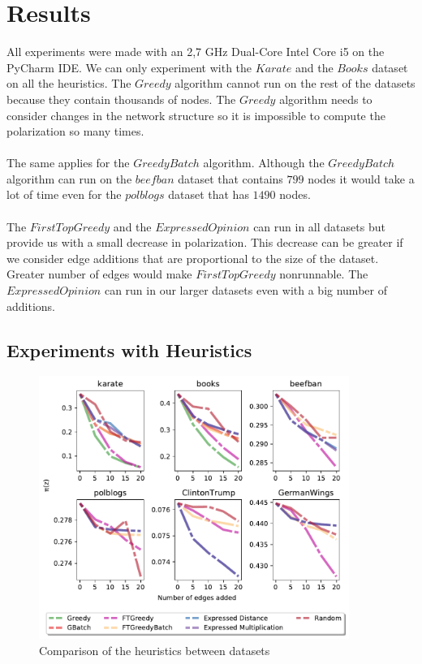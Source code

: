 \section{Results}
\label{sec:experim}

All experiments were made with an 2,7 GHz Dual-Core Intel Core i5 on the PyCharm IDE. We can only experiment with the $Karate$ and the $Books$ dataset on all the heuristics. The $Greedy$ algorithm cannot run on the rest of the datasets because they contain thousands of nodes. The $Greedy$ algorithm needs to consider changes in the network structure so it is impossible to compute the polarization so many times.
\\
\\ 
The same applies for the $GreedyBatch$ algorithm. Although the $GreedyBatch$ algorithm can run on the $beefban$ dataset that contains $799$ nodes it would take a lot of time even for the $polblogs$ dataset that has $1490$ nodes.
\\
\\
The $FirstTopGreedy$ and the $Expressed Opinion$ can run in all datasets but provide us with a small decrease in polarization. This decrease can be greater if we consider edge additions that are proportional to the size of the dataset. Greater number of edges would make $FirstTopGreedy$ nonrunnable. The $Expressed Opinion$ can run in our larger datasets even with a big number of additions.
\clearpage


\subsection{Experiments with Heuristics}


\begin{figure}[!htbp]
	\centering
	\captionsetup{justification=centering,margin=2cm}
	\includegraphics[width=0.90\textwidth]{Figures/heuristics_small}
	\caption{Comparison of the heuristics between datasets}
	\label{fig:heuristics_small}
\end{figure}

